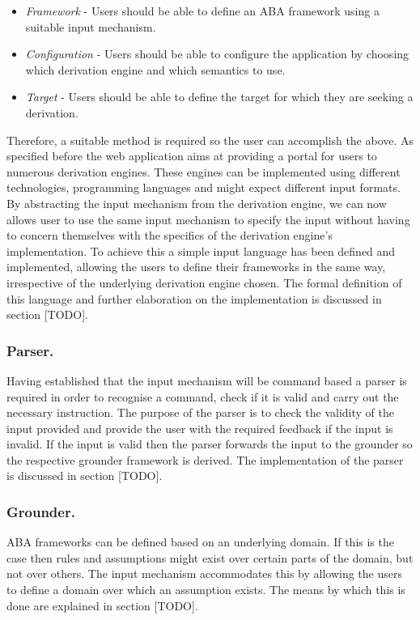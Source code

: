 \begin{itemize}
\item \emph{Framework} - Users should be able to define an ABA framework using a suitable input mechanism.
\item \emph{Configuration} - Users should be able to configure the application by choosing which derivation engine and which semantics to use.
\item \emph{Target} - Users should be able to define the target for which they are seeking a derivation.
\end{itemize}

Therefore, a suitable method is required so the user can accomplish the above. As specified before the web application aims at providing a portal for users to numerous derivation engines. These engines can be implemented using different technologies, programming languages and might expect different input formats. By abstracting the input mechanism from the derivation engine, we can now allows user to use the same input mechanism to specify the input without having to concern themselves with the specifics of the derivation engine's implementation. To achieve this a simple input language has been defined and implemented, allowing the users to define their frameworks in the same way, irrespective of the underlying derivation engine chosen. The formal definition of this language and further elaboration on the implementation is discussed in section [TODO].

\subsubsection{Parser.}
Having established that the input mechanism will be command based a parser is required in order to recognise a command, check if it is valid and carry out the necessary instruction. The purpose of the parser is to check the validity of the input provided and provide the user with the required feedback if the input is invalid. If the input is valid then the parser forwards the input to the grounder so the respective grounder framework is derived. The implementation of the parser is discussed in section [TODO].

\subsubsection{Grounder.}
ABA frameworks can be defined based on an underlying domain. If this is the case then rules and assumptions might exist over certain parts of the domain, but not over others. The input mechanism accommodates this by allowing the users to define a domain over which an assumption exists. The means by which this is done are explained in section [TODO].

